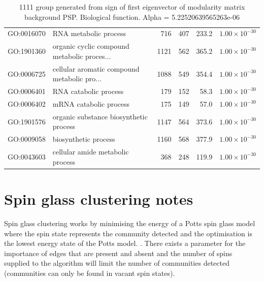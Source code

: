 \begin{table}[ht]
\begin{tabular}{llrrrr}
  GO:0016070 & RNA metabolic process & 716 & 407 & 233.2 & $1.00 \times 10^{-30}$ \\ 
  GO:1901360 & organic cyclic compound metabolic proces... & 1121 & 562 & 365.2 & $1.00 \times 10^{-30}$ \\ 
  GO:0006725 & cellular aromatic compound metabolic pro... & 1088 & 549 & 354.4 & $1.00 \times 10^{-30}$ \\ 
  GO:0006401 & RNA catabolic process & 179 & 152 & 58.3 & $1.00 \times 10^{-30}$ \\ 
  GO:0006402 & mRNA catabolic process & 175 & 149 & 57.0 & $1.00 \times 10^{-30}$ \\ 
  GO:1901576 & organic substance biosynthetic process & 1147 & 564 & 373.6 & $1.00 \times 10^{-30}$ \\ 
  GO:0009058 & biosynthetic process & 1160 & 568 & 377.9 & $1.00 \times 10^{-30}$ \\ 
  GO:0043603 & cellular amide metabolic process & 368 & 248 & 119.9 & $1.00 \times 10^{-30}$ \\ 
   \hline
\end{tabular}
\caption{1111 group generated from sign of first eigenvector of modularity matrix background PSP. Biological function. Alpha = 5.22520639565263e-06} 
\label{tab:1111 group generated from sign of first eigenvector of modularity matrix background PSP. Biological function. Alpha = 5.22520639565263e-06}
\end{table}

\section{Spin glass clustering notes}
\label{sec:spin glass}
Spin glass clustering works by minimising the energy of a Potts spin glass model where the spin state represents the community detected and the optimisation is the lowest energy state of the Potts model. \cite{reichardt2006statistical}. There exists a parameter for the importance of edges that are present and absent and the number of spins supplied to the algorithm will limit the number of communities detected (communities can only be found in vacant spin states).

